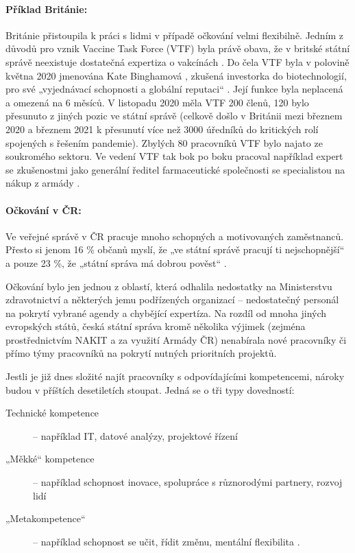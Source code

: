 \paragraph{Příklad Británie:} Británie přistoupila k práci s lidmi v případě očkování velmi flexibilně. Jedním z důvodů pro vznik Vaccine Task Force (VTF) byla právě obava, že v britské státní správě neexistuje dostatečná expertiza o vakcínách \cite{balls_secrets_2021}. Do čela VTF byla v polovině května 2020 jmenována Kate Binghamová \cite{department_for_business_energy__industrial_strategy_kate_2020}, zkušená investorka do biotechnologií, pro své „vyjednávací schopnosti a globální reputaci“ \cite{department_for_business_energy__industrial_strategy_statement_2020}. Její funkce byla neplacená a omezená na 6 měsíců. V listopadu 2020 měla VTF 200 členů, 120 bylo přesunuto z jiných pozic ve státní správě (celkově došlo v Británii mezi březnem 2020 a březnem 2021 k přesunutí více než 3000 úředníků do kritických rolí spojených s řešením pandemie). Zbylých 80 pracovníků VTF bylo najato ze soukromého sektoru. Ve vedení VTF tak bok po boku pracoval například expert se zkušenostmi jako generální ředitel farmaceutické společnosti se specialistou na nákup z armády \cite{national_audit_office_investigation_2020}.

\paragraph{Očkování v ČR:} Ve veřejné správě v ČR pracuje mnoho schopných a motivovaných zaměstnanců. Přesto si jenom 16 \% občanů myslí, že „ve státní správě pracují ti nejschopnější“ a pouze 23 \%, že „státní správa má dobrou pověst“ \cite{aspen_vnimani_2021}.

Očkování bylo jen jednou z oblastí, která odhalila nedostatky na Ministerstvu zdravotnictví a některých jemu podřízených organizací -- nedostatečný personál na pokrytí vybrané agendy a chybějící expertíza. Na rozdíl od mnoha jiných evropských států, česká státní správa kromě několika výjimek (zejména prostřednictvím NAKIT a za využití Armády ČR) nenabírala nové pracovníky či přímo týmy pracovníků na pokrytí nutných prioritních projektů.

Jestli je již dnes složité najít pracovníky s odpovídajícími kompetencemi, nároky budou v příštích desetiletích stoupat. Jedná se o tři typy dovedností:

\begin{description}
  \item[Technické kompetence] -- například IT, datové
analýzy, projektové řízení \cite{thomas_finding_2021, hlidac_nedigitalni_2021}
  \item[„Měkké“ kompetence] -- například schopnost inovace, spolupráce s
různorodými partnery, rozvoj lidí \cite{oecd_public_governance_reviews_skills_2020}
  \item[„Metakompetence“] -- například schopnost se učit, řídit změnu, mentální
flexibilita \cite{dondi_future-citizen_2020}.
  
\end{description}

